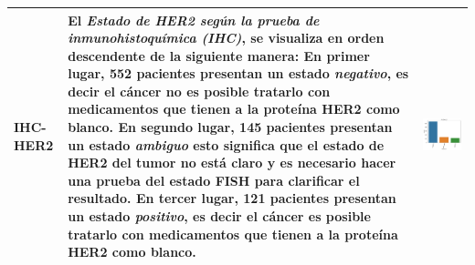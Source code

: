 \begin{table}[!htb]
\begin{threeparttable}
\begin{tabular}{p{2.5cm} p{7cm} p{6.5cm}}
			IHC-HER2
			& El \textit{Estado de HER2 según la prueba de inmunohistoquímica (IHC)}, se visualiza en orden descendente de la siguiente manera: En primer lugar, 552 pacientes presentan un estado \textit{negativo}, es decir el cáncer no es posible tratarlo con medicamentos que tienen a la proteína HER2 como blanco. En segundo lugar, 145 pacientes presentan un estado \textit{ambiguo} esto significa que el estado de HER2 del tumor no está claro y es necesario hacer una prueba del estado FISH para clarificar el resultado. En tercer lugar, 121 pacientes presentan un estado \textit{positivo}, es decir el cáncer es posible tratarlo con medicamentos que tienen a la proteína HER2 como blanco.
			& \begin{center}\includegraphics[width=1\linewidth]{NOTEBOOK/IMAGENES_DESCRIPTIVAS/26_ihc_her_2}\end{center}
			\\ \hline
		\end{tabular}
	\end{threeparttable}
\end{table}

